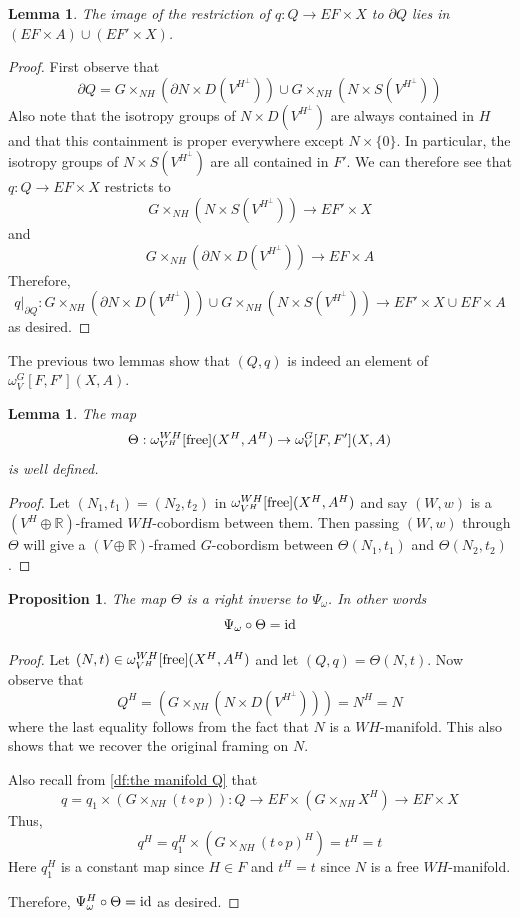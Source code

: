 \documentclass[11pt]{amsart}
\newcommand{\R}{\mathbb R}
\newcommand{\free}{\textup{free}}
\newcommand{\id}{\textup{id}}
\theoremstyle{plain}   %
\newtheorem{lem}[thm]{Lemma}
\newtheorem{prop}[thm]{Proposition}
\theoremstyle{definition}
\theoremstyle{remark}
\numberwithin{equation}{section}
\begin{document}
\begin{lem}
The image of the restriction of $q:Q\to EF\times X$ to $\partial Q$ lies in $(EF\times A)\cup (EF'\times X)$.
\end{lem}

\begin{proof}
First observe that 
\[
\partial Q = G\times_{NH}(\partial N\times D(V^{H^\perp}))\cup G\times_{NH}(N\times S(V^{H^\perp}))
\]
Also note that the isotropy groups of $N\times D(V^{H^\perp})$ are always contained in $H$ and that this containment is proper everywhere except $N\times\{0\}$. In particular, the isotropy groups of $N\times S(V^{H^\perp})$ are all contained in $F'$. We can therefore see that $q:Q\to EF\times X$ restricts to
\[
G\times_{NH}(N\times S(V^{H^\perp}))\rightarrow EF'\times X
\]
and
\[
G\times_{NH}(\partial N \times D(V^{H^\perp}))\to EF\times A
\]
Therefore,
\[
q|_{\partial Q}:G\times_{NH}(\partial N\times D(V^{H^\perp}))\cup G\times_{NH}(N\times S(V^{H^\perp})) \rightarrow EF'\times X\cup EF\times A
\]
as desired. 
\end{proof}

The previous two lemmas show that $(Q,q)$ is indeed an element of $\omega_V^G[F,F'](X,A)$. 

\begin{lem}
The map 
\[
\Theta:\omega_{V^H}^{WH}[\free](X^H,A^H) \rightarrow \omega_V^G[F,F'](X,A)
\]
is well defined.
\end{lem}

\begin{proof}
Let $(N_1,t_1)=(N_2,t_2)$ in $\omega_{V^H}^{WH}[\free](X^H,A^H)$ and say $(W,w)$ is a $(V^H\oplus \R)$-framed $WH$-cobordism between them. Then passing $(W,w)$ through $\Theta$ will give a $(V\oplus \R)$-framed $G$-cobordism between $\Theta(N_1,t_1)$ and $\Theta(N_2,t_2)$. 
\end{proof}

\begin{prop}\label{prop:right inverse}
The map $\Theta$ is a right inverse to $\Psi_\omega$. In other words
\[
\Psi_\omega \circ \Theta = \id
\]
\end{prop}

\begin{proof}
Let $(N,t)\in \omega_{V^H}^{WH}[\free](X^H,A^H)$ and let $(Q,q)=\Theta(N,t)$. Now observe that 
\[
Q^H = (G\times_{NH}(N\times D(V^{H^\perp})))=N^H=N
\]
where the last equality follows from the fact that $N$ is a $WH$-manifold. This also shows that we recover the original framing on $N$.

Also recall from \cref{df:the manifold Q} that 
\[
q=q_1\times (G\times_{NH}(t\circ p)): Q\rightarrow EF\times (G\times_{NH} X^H)\rightarrow EF\times X
\]
Thus,
\[
q^H = q_1^H \times (G\times_{NH}(t\circ p)^H) = t^H=t
\]
Here $q_1^H$ is a constant map since $H\in F$ and $t^H=t$ since $N$ is a free $WH$-manifold. 

Therefore, $\Psi_\omega^H\circ \Theta = \id$ as desired. 
\end{proof}
\end{document}
